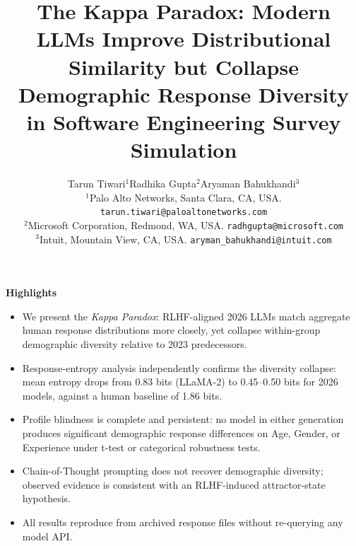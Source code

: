\documentclass[12pt,a4paper]{article}
\newcommand{\kp}{\textit{Kappa Paradox}\xspace}
\begin{document}

\title{\textbf{The Kappa Paradox: Modern LLMs Improve Distributional
Similarity but Collapse Demographic Response Diversity in Software
Engineering Survey Simulation}}

\author{
  Tarun Tiwari$^{1}$\quad Radhika Gupta$^{2}$\quad Aryaman Bahukhandi$^{3}$
  \\[4pt]
  \small $^{1}$Palo Alto Networks, Santa Clara, CA, USA.
  \texttt{tarun.tiwari@paloaltonetworks.com} \\
  \small $^{2}$Microsoft Corporation, Redmond, WA, USA.
  \texttt{radhgupta@microsoft.com} \\
  \small $^{3}$Intuit, Mountain View, CA, USA.
  \texttt{aryman\_bahukhandi@intuit.com}
}

\date{}
\maketitle
\thispagestyle{empty}

\noindent\textbf{Highlights}
\begin{itemize}[leftmargin=1.5em,itemsep=1pt]
  \item We present the \kp: RLHF-aligned 2026 LLMs match aggregate human
        response distributions more closely, yet collapse within-group
        demographic diversity relative to 2023 predecessors.
  \item Response-entropy analysis independently confirms the diversity
        collapse: mean entropy drops from 0.83 bits (LLaMA-2) to 0.45–0.50
        bits for 2026 models, against a human baseline of 1.86 bits.
  \item Profile blindness is complete and persistent: no model in either
        generation produces significant demographic response differences on
        Age, Gender, or Experience under t-test or categorical robustness
        tests.
  \item Chain-of-Thought prompting does not recover demographic diversity;
        observed evidence is consistent with an RLHF-induced
        attractor-state hypothesis.
  \item All results reproduce from archived response files without
        re-querying any model API.
\end{itemize}
\bigskip
\end{document}
